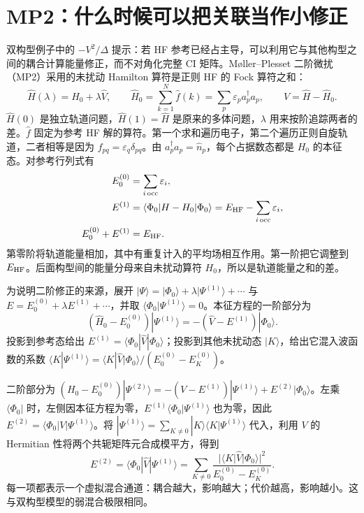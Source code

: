 \section{MP2：什么时候可以把关联当作小修正}
双构型例子中的 $-V^2/\Delta$ 提示：若 HF 参考已经占主导，可以利用它与其他构型之间的耦合计算能量修正，而不对角化完整 CI 矩阵。Møller--Plesset 二阶微扰（MP2）采用的未扰动 Hamilton 算符是正则 HF 的 Fock 算符之和：
\begin{equation}
\hat H(\lambda)=\hat H_0+\lambda\hat V,\qquad
\hat H_0=\sum_{k=1}^N\hat f(k)
=\sum_p\varepsilon_p a_p^\dagger a_p,\qquad \hat V=\hat H-\hat H_0.
\end{equation}
$\hat H(0)$ 是独立轨道问题，$\hat H(1)=\hat H$ 是原来的多体问题，$\lambda$ 用来按阶追踪两者的差。$\hat f$ 固定为参考 HF 解的算符。第一个求和遍历电子，第二个遍历正则自旋轨道，二者相等是因为 $f_{pq}=\varepsilon_q\delta_{pq}$。由 $a_p^\dagger a_p=\hat n_p$，每个占据数态都是 $H_0$ 的本征态。对参考行列式有
\begin{align}
E_0^{(0)}&=\sum_{i\,\mathrm{occ}}\varepsilon_i,\\
E^{(1)}&=\langle\Phi_0|H-H_0|\Phi_0\rangle
=E_{\rm HF}-\sum_{i\,\mathrm{occ}}\varepsilon_i,\\
E_0^{(0)}+E^{(1)}&=E_{\rm HF}.
\end{align}
第零阶将轨道能量相加，其中有重复计入的平均场相互作用。第一阶把它调整到 $E_{\rm HF}$。后面构型间的能量分母来自未扰动算符 $H_0$，所以是轨道能量之和的差。

为说明二阶修正的来源，展开 $|\Psi\rangle=|\Phi_0\rangle+\lambda|\Psi^{(1)}\rangle+\cdots$ 与 $E=E_0^{(0)}+\lambda E^{(1)}+\cdots$，并取 $\langle\Phi_0|\Psi^{(1)}\rangle=0$。本征方程的一阶部分为
\begin{equation}
(\hat H_0-E_0^{(0)})|\Psi^{(1)}\rangle
=-(\hat V-E^{(1)})|\Phi_0\rangle.
\end{equation}
投影到参考态给出 $E^{(1)}=\langle\Phi_0|\hat V|\Phi_0\rangle$；投影到其他未扰动态 $|K\rangle$，给出它混入波函数的系数 $\langle K|\Psi^{(1)}\rangle=\langle K|\hat V|\Phi_0\rangle/(E_0^{(0)}-E_K^{(0)})$。

二阶部分为 $(H_0-E_0^{(0)})|\Psi^{(2)}\rangle=-(V-E^{(1)})|\Psi^{(1)}\rangle+E^{(2)}|\Phi_0\rangle$。左乘 $\langle\Phi_0|$ 时，左侧因本征方程为零，$E^{(1)}\langle\Phi_0|\Psi^{(1)}\rangle$ 也为零，因此 $E^{(2)}=\langle\Phi_0|V|\Psi^{(1)}\rangle$。将 $|\Psi^{(1)}\rangle=\sum_{K\ne0}|K\rangle\langle K|\Psi^{(1)}\rangle$ 代入，利用 $V$ 的 Hermitian 性将两个共轭矩阵元合成模平方，得到
\begin{equation}\label{corr:second-order}
E^{(2)}=\langle\Phi_0|\hat V|\Psi^{(1)}\rangle
=\sum_{K\ne0}\frac{|\langle K|\hat V|\Phi_0\rangle|^2}{E_0^{(0)}-E_K^{(0)}}.
\end{equation}
每一项都表示一个虚拟混合通道：耦合越大，影响越大；代价越高，影响越小。这与双构型模型的弱混合极限相同。

